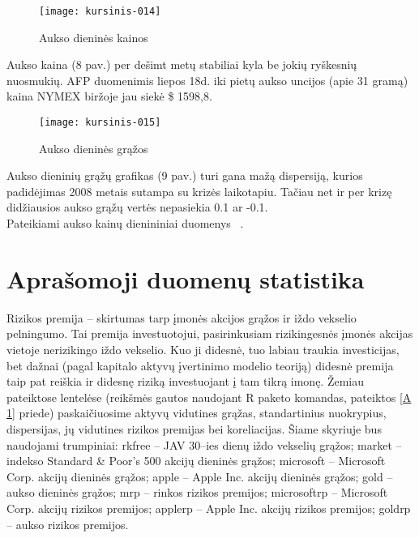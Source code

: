 \documentclass[12pt, a14paper, lithuanian]{article}
\begin{document}
\begin{figure}[H]
  \centering
\texttt{[image: kursinis-014]}
  \caption{Aukso dieninės kainos}
  \label{fig:8}
\end{figure}

Aukso kaina (8 pav.) per dešimt metų stabiliai kyla be jokių ryškesnių nuosmukių. AFP duomenimis liepos 18d. iki pietų aukso uncijos (apie 31 gramą) kaina NYMEX biržoje jau siekė \$ 1598,8.


\begin{figure}[H]
  \centering
\texttt{[image: kursinis-015]}
  \caption{Aukso dieninės grąžos}
  \label{fig:9}
\end{figure}
             
Aukso dieninių grąžų grafikas (9 pav.) turi gana mažą dispersiją, kurios padidėjimas 2008 metais 
sutampa su krizės laikotapiu. Tačiau net ir per krizę didžiausios aukso grąžų vertės nepasiekia 0.1 ar -0.1. \\

Pateikiami aukso kainų dienininiai duomenys~\cite{gold} .

\newpage
\section{Aprašomoji duomenų statistika}

Rizikos premija -- skirtumas tarp įmonės akcijos grąžos ir iždo vekselio pelningumo. Tai premija investuotojui,
pasirinkusiam rizikingesnės įmonės akcijas vietoje nerizikingo iždo vekselio. Kuo ji didesnė, tuo labiau
traukia investicijas, bet dažnai (pagal kapitalo aktyvų įvertinimo modelio teoriją) didesnė premija taip pat reiškia ir didesnę riziką 
investuojant į tam tikrą imonę. Žemiau pateiktose lentelėse (reikšmės gautos naudojant R paketo komandas, pateiktos \ref{A 1} priede) paskaičiuosime aktyvų vidutines grąžas,
standartinius nuokrypius, dispersijas, jų vidutines rizikos premijas bei koreliacijas. Šiame skyriuje bus naudojami trumpiniai:
rkfree -- JAV 30--ies dienų iždo vekselių grąžos;
market -- indekso Standard \& Poor's 500 akcijų dieninės grąžos;
microsoft -- Microsoft Corp. akcijų dieninės grąžos;
apple -- Apple Inc. akcijų dieninės grąžos;
gold -- aukso dieninės grąžos;
mrp -- rinkos rizikos premijos;
microsoftrp -- Microsoft Corp. akcijų rizikos premijos;
applerp -- Apple Inc. akcijų rizikos premijos;
goldrp -- aukso rizikos premijos. 
\end{document}
